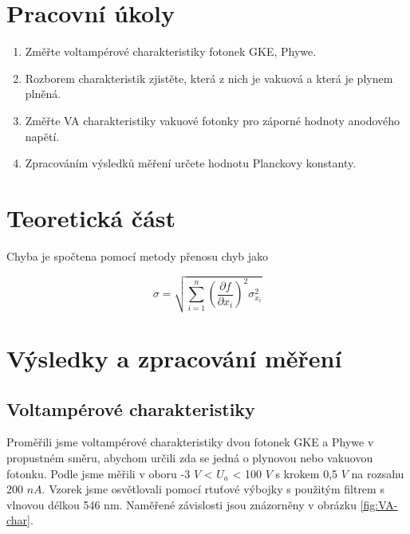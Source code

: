 \section{Pracovní úkoly}

\begin{enumerate}
\item Změřte voltampérové charakteristiky fotonek GKE, Phywe.

\item Rozborem charakteristik zjistěte, která z nich je vakuová a která je plynem plněná.

\item Změřte VA charakteristiky vakuové fotonky pro záporné hodnoty anodového napětí.

\item Zpracováním výsledků měření určete hodnotu Planckovy konstanty.
\end{enumerate}

\section{Teoretická část}

Chyba je spočtena pomocí metody přenosu chyb \cite{bib:metoda-prenosu-chyb} jako

\begin{equation}
    \sigma = \sqrt{\sum^n_{i=1} \left( \frac{\partial f}{\partial x_i} \right)^2 \sigma^2_{x_i}}
\end{equation}

\section{Výsledky a zpracování měření}

\subsection{Voltampérové charakteristiky}
Proměřili jsme voltampérové charakteristiky dvou fotonek GKE a Phywe v propustném směru, abychom určili zda se jedná o plynovou nebo vakuovou fotonku. Podle \cite{bib:zadani} jsme měřili v oboru -3 $V$ < $U_a$ < 100 $V$ s krokem 0,5 $V$ na rozsahu 200 $nA$. Vzorek jsme osvětlovali pomocí rtuťové výbojky s použitým filtrem s vlnovou délkou 546 nm. Naměřené závislosti jsou znázorněny v obrázku \ref{fig:VA-char}.

